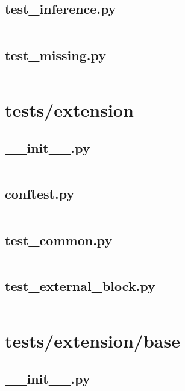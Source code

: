 \documentclass{article}
\begin{document}
\subsection{test\_inference.py}
\inputminted{python}{/home/dufferzafar/dev/@clones/pandas/pandas/tests/dtypes/test_inference.py}
\newpage

\subsection{test\_missing.py}
\inputminted{python}{/home/dufferzafar/dev/@clones/pandas/pandas/tests/dtypes/test_missing.py}
\newpage

\section{tests/extension}

\subsection{\_\_init\_\_.py}
\inputminted{python}{/home/dufferzafar/dev/@clones/pandas/pandas/tests/extension/__init__.py}
\newpage

\subsection{conftest.py}
\inputminted{python}{/home/dufferzafar/dev/@clones/pandas/pandas/tests/extension/conftest.py}
\newpage

\subsection{test\_common.py}
\inputminted{python}{/home/dufferzafar/dev/@clones/pandas/pandas/tests/extension/test_common.py}
\newpage

\subsection{test\_external\_block.py}
\inputminted{python}{/home/dufferzafar/dev/@clones/pandas/pandas/tests/extension/test_external_block.py}
\newpage

\section{tests/extension/base}

\subsection{\_\_init\_\_.py}
\inputminted{python}{/home/dufferzafar/dev/@clones/pandas/pandas/tests/extension/base/__init__.py}
\newpage
\end{document}
